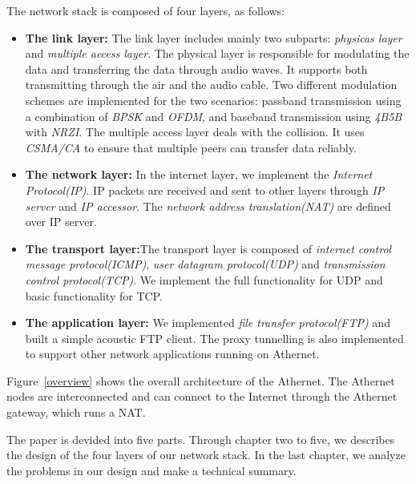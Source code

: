 The network stack is composed of four layers, as follows:
\begin{itemize}
  \item \textbf{The link layer:} The link layer includes mainly two subparts:  \emph{physicas layer} and \emph{multiple access layer}. The physical layer is responsible for modulating the data and transferring the data through audio waves. It supports both transmitting through the air and the audio cable. Two different modulation schemes are implemented for the two scenarios: passband transmission using a combination of \emph{BPSK} and \emph{OFDM}, and baseband transmission using \emph{4B5B} with \emph{NRZI}. The multiple access layer deals with the collision. It uses \emph{CSMA/CA} to ensure that multiple peers can transfer data reliably.
  \item \textbf{The network layer:} In the internet layer, we implement the  \emph{Internet Protocol(IP)}. IP packets are received and sent to other layers through \emph{IP server} and \emph{IP accessor}. The \emph{network address translation(NAT)} are defined over IP server.
  \item \textbf{The transport layer:}The transport layer is composed of \emph {internet control message protocol(ICMP)}, \emph{user datagram protocol(UDP)} and \emph{transmission control protocol(TCP)}. We implement the full functionality for UDP and basic functionality for TCP.
  \item \textbf{The application layer:} We implemented \emph{file transfer protocol(FTP)} and built a simple acoustic FTP client. The proxy tunnelling is also implemented to support other network applications running on Athernet.
\end{itemize}
Figure~\ref{overview} shows the overall architecture of the Athernet. The Athernet nodes are interconnected and can connect to the Internet through the Athernet gateway, which runs a NAT.\par
The paper is devided into five parts. Through chapter two to five, we describes the design of the four layers of our network stack. In the last chapter, we analyze the problems in our design and make a technical summary.